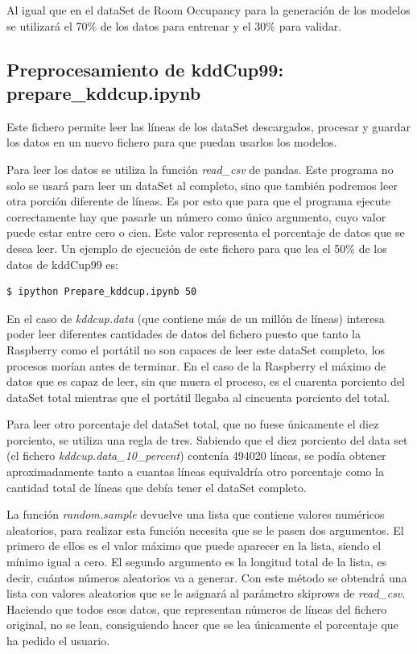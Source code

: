 \documentclass[a4paper, 12pt]{book}
\begin{document}
Al igual que en el dataSet de Room Occupancy para la generación de los modelos se utilizará el 70\% de los datos para entrenar y el 30\% para validar.

\subsection{Preprocesamiento de kddCup99: prepare\_kddcup.ipynb}

Este fichero permite leer las líneas de los dataSet descargados, procesar y guardar los datos en un nuevo fichero para que puedan usarlos los modelos.

Para leer los datos se utiliza la función \textit{read\_csv} de pandas. Este programa no solo se usará para leer un dataSet al completo, sino que también podremos leer otra porción diferente de líneas. Es por esto que para que el programa ejecute correctamente hay que pasarle un número como único argumento, cuyo valor puede estar entre cero o cien. Este valor representa el porcentaje de datos que se desea leer. Un ejemplo de ejecución de este fichero para que lea el 50\% de los datos de kddCup99 es:\\

\begin{lstlisting}[language=bash]
    $ ipython Prepare_kddcup.ipynb 50
\end{lstlisting}

En el caso de \textit{kddcup.data} (que contiene más de un millón de líneas) interesa poder leer diferentes cantidades de datos del fichero puesto que tanto la Raspberry como el portátil no son capaces de leer este dataSet completo, los procesos morían antes de terminar. En el caso de la Raspberry el máximo de datos que es capaz de leer, sin que muera el proceso, es el cuarenta porciento del dataSet total mientras que el portátil llegaba al cincuenta porciento del total.

Para leer otro porcentaje del dataSet total, que no fuese únicamente el diez porciento, se utiliza una regla de tres. Sabiendo que el diez porciento del data set (el fichero \textit{kddcup.data\_10\_percent}) contenía 494020 líneas, se podía obtener aproximadamente tanto a cuantas líneas equivaldría otro porcentaje como la cantidad total de líneas que debía tener el dataSet completo.

La función \textit{random.sample} devuelve una lista que contiene valores numéricos aleatorios, para realizar esta función necesita que se le pasen dos argumentos. El primero de ellos es el valor máximo que puede aparecer en la lista, siendo el mínimo igual a cero. El segundo argumento es la longitud total de la lista, es decir, cuántos números aleatorios va a generar. Con este método se obtendrá una lista con valores aleatorios que se le asignará al parámetro skiprows de \textit{read\_csv}. Haciendo que todos esos datos, que representan números de líneas del fichero original, no se lean, consiguiendo hacer que se lea únicamente el porcentaje que ha pedido el usuario.
\end{document}
